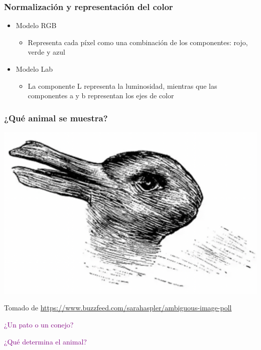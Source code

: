 \documentclass[
10pt, %
aspectratio=169, %
]{beamer}
\begin{document}
	\begin{frame}
		
		\frametitle{Normalización y representación del color}
		
		\begin{itemize}
			\item Modelo RGB
			\begin{itemize}
				\item Representa cada píxel como una combinación de los componentes: rojo, verde y azul
			\end{itemize}
			
			\vspace{2\baselineskip}
			
			\item Modelo Lab
			\begin{itemize}
				\item La componente L representa la luminosidad, mientras que las componentes a y b representan los ejes de color
			\end{itemize}
		\end{itemize}
		
	\end{frame}
		
	\begin{frame}
		
		\frametitle{¿Qué animal se muestra?}
		
		\centering
		\includegraphics[scale=0.45]{pato-conejo.png} 
		
		{\scriptsize Tomado de \url{https://www.buzzfeed.com/sarahaspler/ambiguous-image-poll}}
		
		\vspace{1\baselineskip}
		\pause 
		\textcolor{purple}{¿Un pato o un conejo?}
		
		\pause 
		\textcolor{purple}{¿Qué determina el animal?}
		 
	\end{frame}
	
\end{document}
